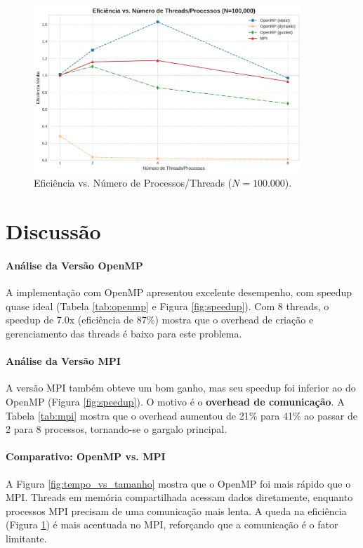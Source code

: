 \documentclass[12pt, a4paper]{article}
\begin{document}
\begin{figure}[H]
    \centering
    \includegraphics[width=0.9\textwidth]{../graficos/eficiencia_vs_processos_100000.png}
    \caption{Eficiência vs. Número de Processos/Threads ($N=100.000$).}
    \label{fig:eficiencia}
\end{figure}

\section{Discussão}

\paragraph{Análise da Versão OpenMP} A implementação com OpenMP apresentou excelente desempenho, com speedup quase ideal (Tabela \ref{tab:openmp} e Figura \ref{fig:speedup}). Com 8 threads, o speedup de 7.0x (eficiência de 87\%) mostra que o overhead de criação e gerenciamento das threads é baixo para este problema.

\paragraph{Análise da Versão MPI} A versão MPI também obteve um bom ganho, mas seu speedup foi inferior ao do OpenMP (Figura \ref{fig:speedup}). O motivo é o \textbf{overhead de comunicação}. A Tabela \ref{tab:mpi} mostra que o overhead aumentou de 21\% para 41\% ao passar de 2 para 8 processos, tornando-se o gargalo principal.

\paragraph{Comparativo: OpenMP vs. MPI} A Figura \ref{fig:tempo_vs_tamanho} mostra que o OpenMP foi mais rápido que o MPI. Threads em memória compartilhada acessam dados diretamente, enquanto processos MPI precisam de uma comunicação mais lenta. A queda na eficiência (Figura \ref{fig:eficiencia}) é mais acentuada no MPI, reforçando que a comunicação é o fator limitante.
\end{document}
